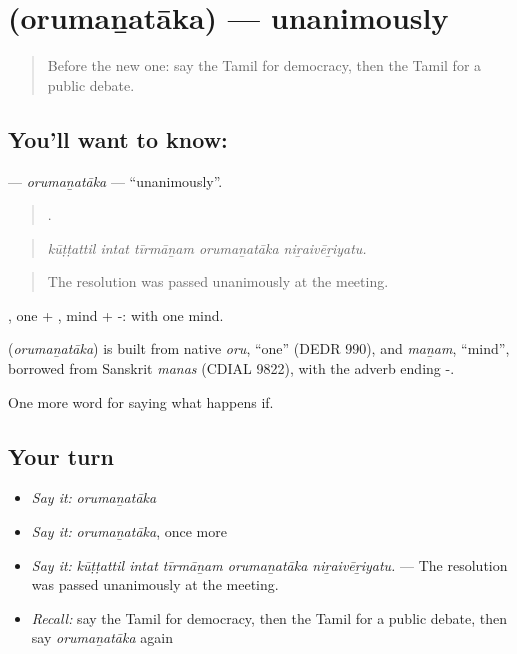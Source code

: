 \section[\texorpdfstring{\ta{ஒருமனதாக} (orumaṉatāka)}{ஒருமனதாக (orumaṉatāka)}]{ (orumaṉatāka) — unanimously}

\label{lesson:TA-C397-orumanataka}



\begin{quote}
Before the new one: say the Tamil for democracy, then the Tamil for a public debate.
\end{quote}

\subsection*{You'll want to know: }
\textbf{} — \emph{orumaṉatāka} — \textquotedblleft{}unanimously\textquotedblright{}.

\begin{quote}
    .
\end{quote}

\begin{quote}
\emph{kūṭṭattil intat tīrmāṉam orumaṉatāka niṟaivēṟiyatu.}
\end{quote}

\begin{quote}
The resolution was passed unanimously at the meeting.
\end{quote}

, one + , mind + -: with one mind.

\begin{cousinweb}
\textbf{} (\emph{orumaṉatāka}) is built from native \emph{oru}, \textquotedblleft{}one\textquotedblright{} (DEDR 990), and \emph{maṉam}, \textquotedblleft{}mind\textquotedblright{}, borrowed from Sanskrit \emph{manas} (CDIAL 9822), with the adverb ending -.
\end{cousinweb}

\begin{grammarlens}[title={What you've built}]
One more word for saying what happens if.
\end{grammarlens}

\subsection*{Your turn}
\begin{itemize}
\raggedright
  \item \emph{Say it:} \emph{orumaṉatāka}
  \item \emph{Say it:} \emph{orumaṉatāka}, once more
  \item \emph{Say it:} \emph{kūṭṭattil intat tīrmāṉam orumaṉatāka niṟaivēṟiyatu.} — The resolution was passed unanimously at the meeting.
  \item \emph{Recall:} say the Tamil for democracy, then the Tamil for a public debate, then say \emph{orumaṉatāka} again
\end{itemize}

